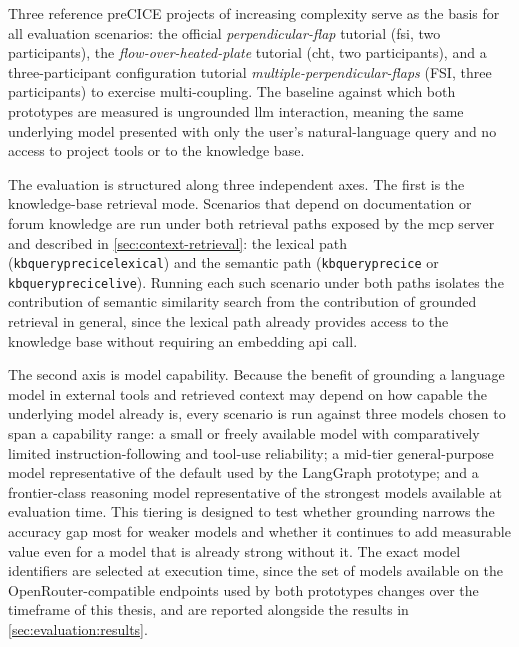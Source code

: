 \documentclass[
  numbers=noenddot,
  english,
  a4paper,
  twoside,
  bibliography=totoc,
  headsepline,
  cleardoublepage=empty,
  parskip=half,
  draft=false
]{scrbook}
\theoremstyle{break}
\renewcommand{\_}{\textunderscore\allowbreak}
\begin{document}
Three reference preCICE projects of increasing complexity serve as the basis for all
evaluation scenarios: the official \emph{perpendicular-flap} tutorial (\gls{fsi}, two
participants), the \emph{flow-over-heated-plate} tutorial (\gls{cht}, two participants), and
a three-participant configuration tutorial \emph{multiple-perpendicular-flaps} (FSI, three participants) to exercise multi-coupling. 
The baseline against which both prototypes are measured is ungrounded \gls{llm} interaction,
meaning the same underlying model presented with only the user's natural-language query and
no access to project tools or to the knowledge base.

The evaluation is structured along three independent axes. The first is the knowledge-base
retrieval mode. Scenarios that depend on documentation or forum knowledge are run under both
retrieval paths exposed by the \gls{mcp} server and described in \cref{sec:context-retrieval}:
the lexical path (\texttt{kb\_query\_precice\_lexical}) and the semantic path
(\texttt{kb\_query\_precice} or \texttt{kb\_query\_precice\_live}). Running each such scenario
under both paths isolates the contribution of semantic similarity search from the contribution
of grounded retrieval in general, since the lexical path already provides access to the
knowledge base without requiring an embedding \gls{api} call.

The second axis is model capability. Because the benefit of grounding a language model in
external tools and retrieved context may depend on how capable the underlying model already
is, every scenario is run against three models chosen to span a capability range: a small or
freely available model with comparatively limited instruction-following and tool-use
reliability; a mid-tier general-purpose model representative of the default used by the
LangGraph prototype; and a frontier-class reasoning model representative of the strongest
models available at evaluation time. This tiering is designed to test whether grounding
narrows the accuracy gap most for weaker models and whether it continues to add measurable
value even for a model that is already strong without it. The exact model identifiers are
selected at execution time, since the set of models available on the OpenRouter-compatible
endpoints used by both prototypes changes over the timeframe of this thesis, and are reported
alongside the results in \cref{sec:evaluation:results}.
\end{document}
